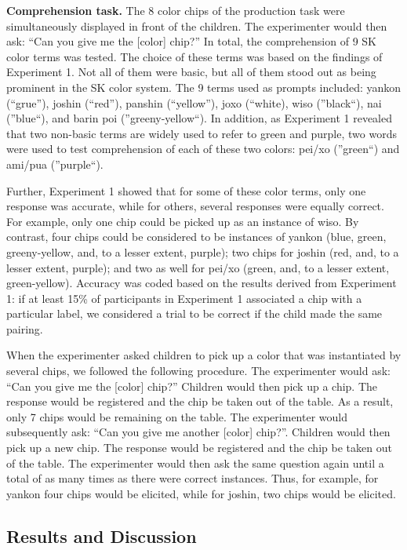 \documentclass[floatsintext,man]{apa6}
\theoremstyle{definition}
\theoremstyle{definition}
\theoremstyle{definition}
\theoremstyle{remark}
\begin{document}
\textbf{Comprehension task.} The 8 color chips of the production task
were simultaneously displayed in front of the children. The experimenter
would then ask: \enquote{Can you give me the {[}color{]} chip?} In
total, the comprehension of 9 SK color terms was tested. The choice of
these terms was based on the findings of Experiment 1. Not all of them
were basic, but all of them stood out as being prominent in the SK color
system. The 9 terms used as prompts included: yankon (\enquote{grue}),
joshin (\enquote{red}), panshin (\enquote{yellow}), joxo
(\enquote{white), wiso (}black\enquote{), nai (}blue\enquote{), and
barin poi (}greeny-yellow\enquote{). In addition, as Experiment 1
revealed that two non-basic terms are widely used to refer to green and
purple, two words were used to test comprehension of each of these two
colors: pei/xo (}green\enquote{) and ami/pua (}purple``).

Further, Experiment 1 showed that for some of these color terms, only
one response was accurate, while for others, several responses were
equally correct. For example, only one chip could be picked up as an
instance of wiso. By contrast, four chips could be considered to be
instances of yankon (blue, green, greeny-yellow, and, to a lesser
extent, purple); two chips for joshin (red, and, to a lesser extent,
purple); and two as well for pei/xo (green, and, to a lesser extent,
green-yellow). Accuracy was coded based on the results derived from
Experiment 1: if at least 15\% of participants in Experiment 1
associated a chip with a particular label, we considered a trial to be
correct if the child made the same pairing.

When the experimenter asked children to pick up a color that was
instantiated by several chips, we followed the following procedure. The
experimenter would ask: \enquote{Can you give me the {[}color{]} chip?}
Children would then pick up a chip. The response would be registered and
the chip be taken out of the table. As a result, only 7 chips would be
remaining on the table. The experimenter would subsequently ask:
\enquote{Can you give me another {[}color{]} chip?}. Children would then
pick up a new chip. The response would be registered and the chip be
taken out of the table. The experimenter would then ask the same
question again until a total of as many times as there were correct
instances. Thus, for example, for yankon four chips would be elicited,
while for joshin, two chips would be elicited.

\subsection{Results and Discussion}\label{results-and-discussion-1}
\end{document}
